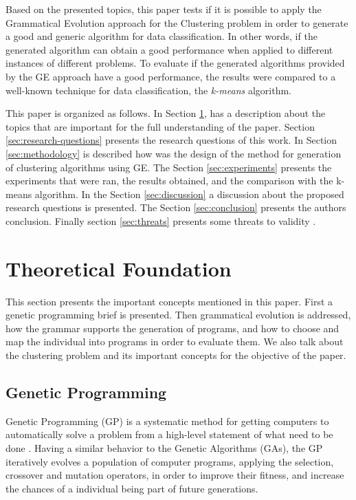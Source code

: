 \documentclass[journal]{IEEEtran}
\begin{document}
Based on the presented topics, this paper tests if it is possible to apply the Grammatical Evolution approach for the Clustering problem in order to generate a good and generic algorithm for data classification. In other words, if the generated algorithm can obtain a good performance when applied to different instances of different problems. To evaluate if the generated algorithms provided by the GE approach have a good performance, the results were compared to a well-known technique for data classification, the \textit{k-means} algorithm.

This paper is organized as follows. In Section \ref{sec:theoretical_foudation}, has a description about the topics that are important for the full understanding of the paper. Section \ref{sec:research-questions} presents the research questions of this work. In Section \ref{sec:methodology} is described how was the design of the method for generation of clustering algorithms using GE. The Section \ref{sec:experiments} presents the experiments that were ran, the results obtained, and the comparison with the k-means algorithm. In the Section \ref{sec:discussion} a discussion about the proposed research questions is presented. The Section \ref{sec:conclusion} presents the authors conclusion. Finally section \ref{sec:threats} presents some threats to validity .


\section{Theoretical Foundation} \label{sec:theoretical_foudation}

This section presents the important concepts mentioned in this paper. First a genetic programming brief is presented. Then grammatical evolution is addressed, how the grammar supports the generation of programs, and how to choose and map the individual into programs in order to evaluate them. We also talk about the clustering problem and its important concepts for the objective of the paper.


\subsection{Genetic Programming}

Genetic Programming (GP) is a systematic method for getting computers to automatically solve a problem from a high-level statement of what need to be done \cite{koza2005genetic}. Having a similar behavior to the Genetic Algorithms (GAs), the GP iteratively evolves a population of computer programs, applying the selection, crossover and mutation operators, in order to improve their fitness, and increase the chances of a individual being part of future generations.
\end{document}
